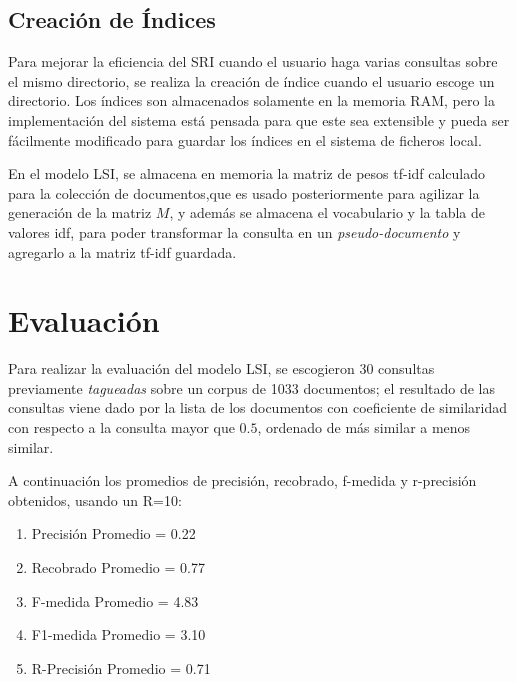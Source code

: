 \documentclass[a4paper, 10pt]{article}
\begin{document}
	\subsection{Creaci\'on de \'Indices}
	Para mejorar la eficiencia del SRI cuando el usuario haga varias consultas sobre el mismo directorio, se realiza la creaci\'on de \'indice cuando el usuario escoge un directorio. Los \'indices son almacenados solamente en la memoria RAM, pero la implementaci\'on del sistema est\'a pensada para que este sea extensible y pueda ser f\'acilmente modificado para guardar los \'indices en el sistema de ficheros local.

	En el modelo LSI, se almacena en memoria la matriz de pesos tf-idf calculado para la colecci\'on de documentos,que es usado posteriormente para agilizar la generaci\'on de la matriz $M$, y adem\'as se almacena el vocabulario y la tabla de valores idf, para poder transformar la consulta en un \textit{pseudo-documento} y agregarlo a la matriz tf-idf guardada.
	
	\section{Evaluación}
	Para realizar la evaluaci\'on del modelo LSI, se escogieron 30 consultas previamente \textit{tagueadas} 
	sobre un corpus de 1033 documentos; el resultado de las consultas viene dado por la lista de los documentos 
	con coeficiente de similaridad con respecto a la consulta mayor que $0.5$, ordenado de m\'as similar a menos similar.
	
	A continuación los promedios de precisión, recobrado, f-medida y r-precisión obtenidos, usando un R=10:
	\begin{enumerate}
       \item Precisión Promedio = 0.22
        \item Recobrado Promedio = 0.77
        \item F-medida Promedio = 4.83
        \item F1-medida Promedio = 3.10
        \item R-Precisión Promedio = 0.71

    \end{enumerate}
\end{document}
